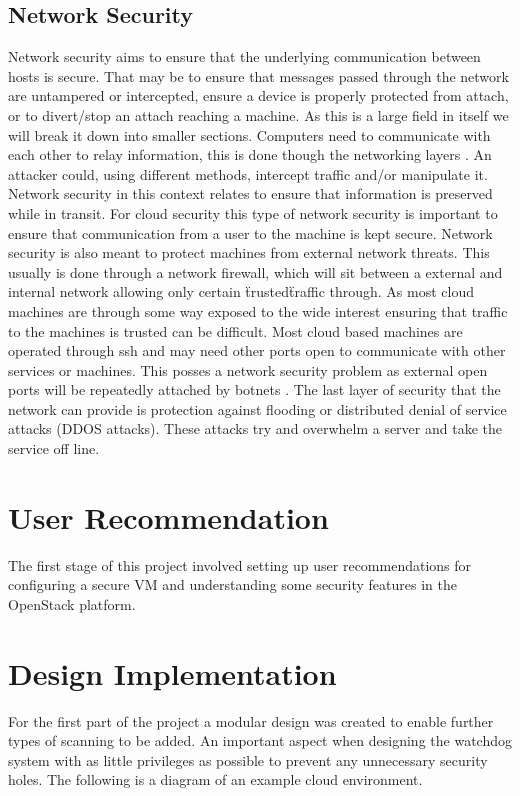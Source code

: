 \documentclass[12pt]{article}
\begin{document}
\subsection{Network Security}
Network security aims to ensure that the underlying communication between hosts is secure. That may be to ensure that messages passed through the network are untampered or intercepted, ensure a device is properly protected from attach, or to divert/stop an attach reaching a machine. As this is a large field in itself we will break it down into smaller sections. Computers need to communicate with each other to relay information, this is done though the networking layers \cite{wiki:osiModel}. An attacker could, using different methods, intercept traffic and/or manipulate it. Network security in this context relates to ensure that information is preserved while in transit. For cloud security this type of network security is important to ensure that communication from a user to the machine is kept secure. Network security is also meant to protect machines from external network threats. This usually is done through a network firewall, which will sit between a external and internal network allowing only certain \"trusted\" traffic through. As most cloud machines are through some way exposed to the wide interest ensuring that traffic to the machines is trusted can be difficult. Most cloud based machines are operated through ssh and may need other ports open to communicate with other services or machines. This posses a network security problem as external open ports will be repeatedly attached by botnets \cite{wiki:botnets}. The last layer of security that the network can provide is protection against flooding or distributed denial of service attacks (DDOS attacks). These attacks try and overwhelm a server and take the service off line.

\section{User Recommendation}
The first stage of this project involved setting up user recommendations for configuring a secure VM and understanding some security features in the OpenStack platform.

\section{Design Implementation}
For the first part of the project a modular design was created to enable further types of scanning to be added. An important aspect when designing the watchdog system with as little privileges as possible to prevent any unnecessary security holes. The following is a diagram of an example cloud environment.
\end{document}
